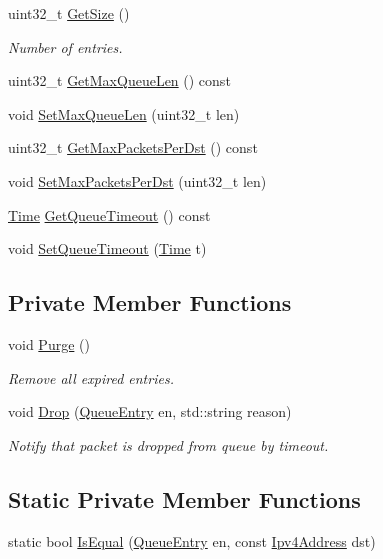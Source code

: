 \begin{DoxyCompactItemize}
uint32\+\_\+t \hyperlink{classns3_1_1dsdv_1_1PacketQueue_a750099896a013a01a1c1093db34808bb}{Get\+Size} ()
\begin{DoxyCompactList}\small\item\em Number of entries. \end{DoxyCompactList}\item 
uint32\+\_\+t \hyperlink{classns3_1_1dsdv_1_1PacketQueue_a5b3ec32fe549d1e47e751f354f89aed6}{Get\+Max\+Queue\+Len} () const 
\item 
void \hyperlink{classns3_1_1dsdv_1_1PacketQueue_ae85d6e3fc35f328c409e36085bd00a89}{Set\+Max\+Queue\+Len} (uint32\+\_\+t len)
\item 
uint32\+\_\+t \hyperlink{classns3_1_1dsdv_1_1PacketQueue_a6197e43b7ec8392a9047ba9200721371}{Get\+Max\+Packets\+Per\+Dst} () const 
\item 
void \hyperlink{classns3_1_1dsdv_1_1PacketQueue_a431b04e4c8babfd1b87b4a522ec4df52}{Set\+Max\+Packets\+Per\+Dst} (uint32\+\_\+t len)
\item 
\hyperlink{classns3_1_1Time}{Time} \hyperlink{classns3_1_1dsdv_1_1PacketQueue_ad7435ce96cf290abec66f9af2b85e761}{Get\+Queue\+Timeout} () const 
\item 
void \hyperlink{classns3_1_1dsdv_1_1PacketQueue_a3810ab4e1688dc7ea8fe09675b1fd603}{Set\+Queue\+Timeout} (\hyperlink{classns3_1_1Time}{Time} t)
\end{DoxyCompactItemize}
\subsection*{Private Member Functions}
\begin{DoxyCompactItemize}
\item 
void \hyperlink{classns3_1_1dsdv_1_1PacketQueue_af2666188cd217249c9d398d8a7c0f93b}{Purge} ()
\begin{DoxyCompactList}\small\item\em Remove all expired entries. \end{DoxyCompactList}\item 
void \hyperlink{classns3_1_1dsdv_1_1PacketQueue_a793164d7fc231d298346ee949ec73312}{Drop} (\hyperlink{classns3_1_1dsdv_1_1QueueEntry}{Queue\+Entry} en, std\+::string reason)
\begin{DoxyCompactList}\small\item\em Notify that packet is dropped from queue by timeout. \end{DoxyCompactList}\end{DoxyCompactItemize}
\subsection*{Static Private Member Functions}
\begin{DoxyCompactItemize}
\item 
static bool \hyperlink{classns3_1_1dsdv_1_1PacketQueue_abde709d18171d13908594060c2a8f0de}{Is\+Equal} (\hyperlink{classns3_1_1dsdv_1_1QueueEntry}{Queue\+Entry} en, const \hyperlink{classns3_1_1Ipv4Address}{Ipv4\+Address} dst)
\end{DoxyCompactItemize}
